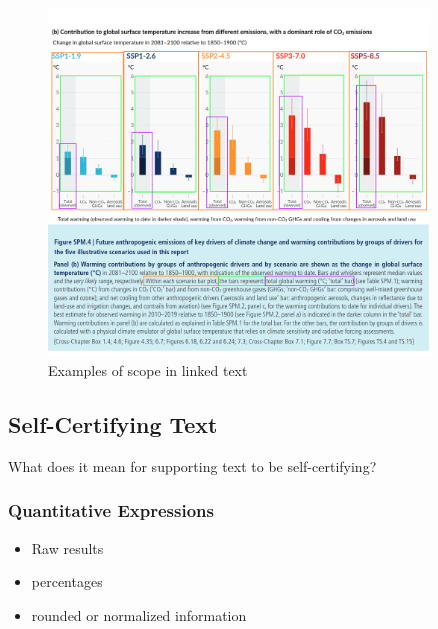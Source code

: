 \begin{figure}
   \includegraphics[width=0.9\textwidth]{fig/ipcc-visual-elements.png}
   \caption{Examples of scope in linked text}
   \label{fig:visual-element-scope}
\end{figure}

\subsection{Self-Certifying Text}
What does it mean for supporting text to be self-certifying? 

\subsubsection{Quantitative Expressions}
\begin{itemize}
   \item Raw results
   \item percentages
   \item rounded or normalized information
\end{itemize}

